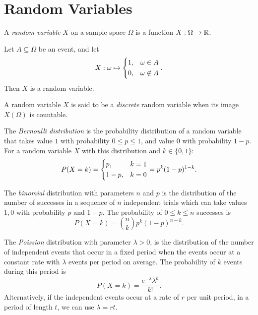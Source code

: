 \section{Random Variables}

\begin{defn}
    A \emph{random variable} $X$ on a sample space $\Omega$ is a function $X: \Omega \to \mathbb{R}$.
\end{defn}

\begin{exmp}
    Let $A \subseteq \Omega$ be an event, and let
    \[X: \omega \mapsto \begin{dcases}
        1, & \omega \in A \\
        0, & \omega \not\in A
    \end{dcases}.\]
    Then $X$ is a random variable.
\end{exmp}

\begin{defn}
    A random variable $X$ is said to be a \emph{discrete} random variable when its image $X(\Omega)$ is countable.
\end{defn}

\begin{defn}
    The \emph{Bernoulli distribution} is the probability distribution of a random variable that takes value $1$ with probability $0 \leq p \leq 1$, and value $0$ with probability $1 - p$. For a random variable $X$ with this distribution and $k \in \{0, 1\}$:
    \[P(X = k) = \begin{dcases}
        p, & k = 1  \\
        1 - p, & k = 0
    \end{dcases} = p^k(1-p)^{1-k}.\]
\end{defn}

\begin{defn}
    The \emph{binomial} distribution with parameters $n$ and $p$ is the distribution of the number of successes in a sequence of $n$ independent trials which can take values $1, 0$ with probability $p$ and $1 - p$. The probability of $ 0 \leq k \leq n$ successes is
    \[P(X = k) = \binom{n}{k}p^k(1 - p)^{n-k}.\]
\end{defn}

\begin{defn}
    The \emph{Poission} distribution with parameter $\lambda > 0$, is the distribution of the number of independent events that occur in a fixed period when the events occur at a constant rate with $\lambda$ events per period on average. The probability of $k$ events during this period is
    \[P(X = k) = \frac{e^{-\lambda}\lambda^k}{k!}.\]
    Alternatively, if the independent events occur at a rate of $r$ per unit period, in a period of length $t$, we can use $\lambda = rt$.
\end{defn}

